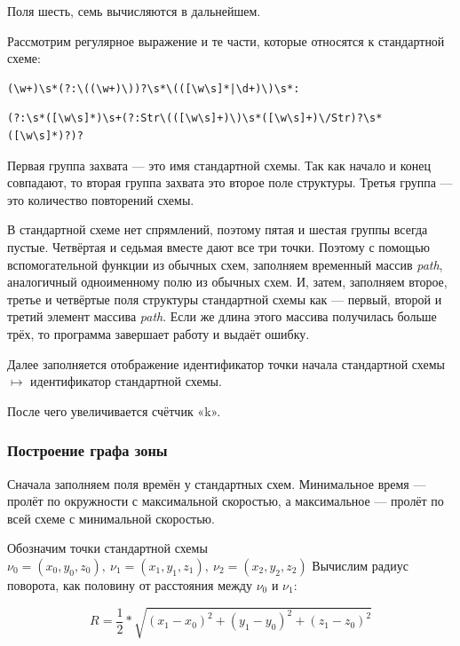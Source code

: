 \documentclass[12pt, a4 paper]{article}
\theoremstyle{plain}
\begin{document}
Поля шесть, семь вычисляются в дальнейшем.

Рассмотрим регулярное выражение и те части, которые относятся к стандартной схеме:

\begin{verbatim}
(\w+)\s*(?:\((\w+)\))?\s*\(([\w\s]*|\d+)\)\s*:
\end{verbatim}

\begin{verbatim}
(?:\s*([\w\s]*)\s+(?:Str\(([\w\s]+)\)\s*([\w\s]+)\/Str)?\s*([\w\s]*)?)?
\end{verbatim}

Первая группа захвата --- это имя стандартной схемы. Так как начало и конец совпадают, то вторая группа захвата это второе поле структуры. Третья группа --- это количество повторений схемы.

В стандартной схеме нет спрямлений, поэтому пятая и шестая группы всегда пустые. Четвёртая и седьмая вместе дают все три точки. Поэтому с помощью вспомогательной функции из обычных схем, заполняем временный массив \textit{path}, аналогичный одноименному полю из обычных схем. И, затем, заполняем второе, третье и четвёртые поля структуры стандартной схемы как --- первый, второй и третий элемент массива \textit{path}. Если же длина этого массива получилась больше трёх, то программа завершает работу и выдаёт ошибку.

Далее заполняется отображение идентификатор точки начала стандартной схемы $\mapsto$ идентификатор стандартной схемы.

После чего увеличивается счётчик «k».



\subsubsection{Построение графа зоны}

Сначала заполняем поля времён у стандартных схем. Минимальное время --- пролёт по окружности с максимальной скоростью, а максимальное --- пролёт по всей схеме с минимальной скоростью.

Обозначим точки стандартной схемы $\nu_0 = (x_0, y_0, z_0),~ \nu_1 = (x_1, y_1, z_1),~ \nu_2 = (x_2, y_2, z_2)$
Вычислим радиус поворота, как половину от расстояния между $\nu_0$ и $\nu_1$:

$$
 R = \frac{1}{2} \ast \sqrt{(x_1 - x_0)^2 + (y_1 - y_0)^2 + (z_1 - z_0)^2}
$$
\end{document}
